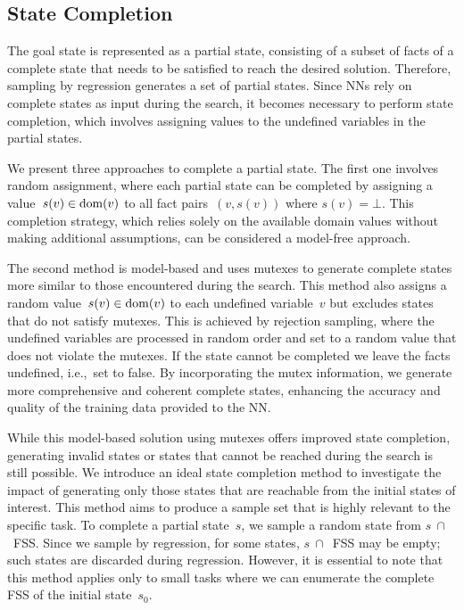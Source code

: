 \subsection{State Completion}
\label{sec:state-completion}

The goal state is represented as a partial state, consisting of a subset of facts of a complete state that needs to be satisfied to reach the desired solution. Therefore, sampling by regression generates a set of partial states. Since NNs rely on complete states as input during the search, it becomes necessary to perform state completion, which involves assigning values to the undefined variables in the partial states.

We present three approaches to complete a partial state. The first one involves random assignment, where each partial state can be completed by assigning a value~$s(v) \in \operatorname{dom}(v)$ to all fact pairs~$(v,s(v))$ where $s(v)=\bot$. This completion strategy, which relies solely on the available domain values without making additional assumptions, can be considered a model-free approach.

The second method is model-based and uses mutexes to generate complete states more similar to those encountered during the search. This method also assigns a random value~$s(v) \in \operatorname{dom}(v)$ to each undefined variable~$v$ but excludes states that do not satisfy mutexes. This is achieved by rejection sampling, where the undefined variables are processed in random order and set to a random value that does not violate the mutexes. If the state cannot be completed we leave the facts undefined, i.e.,~set to false. By incorporating the mutex information, we generate more comprehensive and coherent complete states, enhancing the accuracy and quality of the training data provided to the NN.

While this model-based solution using mutexes offers improved state completion, generating invalid states or states that cannot be reached during the search is still possible. We introduce an ideal state completion method to investigate the impact of generating only those states that are reachable from the initial states of interest. This method aims to produce a sample set that is highly relevant to the specific task. To complete a partial state~$s$, we sample a random state from $s~\cap$~FSS. Since we sample by regression, for some states, $s~\cap$~FSS may be empty; such states are discarded during regression. However, it is essential to note that this method applies only to small tasks where we can enumerate the complete FSS of the initial state~$s_0$.

